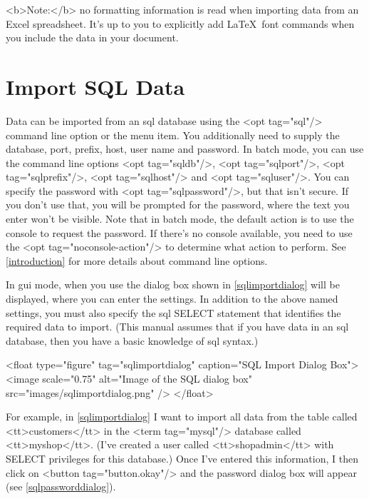   <b>Note:</b> no formatting information is read when importing
   data from an Excel spreadsheet. It's up to you to explicitly
   add \LaTeX\ font commands when you include the data in your
   document.


\section{Import SQL Data}\label{importsql}

   Data can be imported from an \gls{sql} database using
   the <opt tag="sql"/> command line option or the 
    menu item. You additionally need to
   supply the database, port, prefix, host, user name and password. In batch 
   mode, you can use the command line options <opt tag="sqldb"/>,
   <opt tag="sqlport"/>, <opt tag="sqlprefix"/>, <opt tag="sqlhost"/> and
   <opt tag="sqluser"/>. You can specify the password with 
   <opt tag="sqlpassword"/>, but that isn't secure. If you don't use that, 
   you will be prompted for the password, where the text you enter 
   won't be visible. Note that in batch mode, the default action
   is to use the console to request the password. If there's no console available, you need to use the <opt tag="noconsole-action"/>
   to determine what action to perform. See \autoref{introduction} for more details
   about command line options.


   In \gls{gui} mode, when you use 
   the dialog box shown in \autoref{sqlimportdialog} will be displayed,
   where you can enter the settings. In addition to the above named settings,
   you must also specify the \gls{sql} SELECT statement that identifies 
   the required data to import. (This manual assumes that if you have
   data in an \gls{sql} database, then you have a basic
   knowledge of \gls{sql} syntax.)

     <float type="figure" tag="sqlimportdialog" caption="SQL Import Dialog Box">
      <image scale="0.75" alt="Image of the SQL dialog box" src="images/sqlimportdialog.png" />
     </float>

   For example, in \autoref{sqlimportdialog} I want to import all
   data from the table called <tt>customers</tt> in the <term tag="mysql"/>
   database called <tt>myshop</tt>. (I've created a user called
   <tt>shopadmin</tt> with SELECT privileges for this database.) Once I've 
   entered this information,
   I then click on <button tag="button.okay"/> and the password
   dialog box will appear (see \autoref{sqlpassworddialog}).

